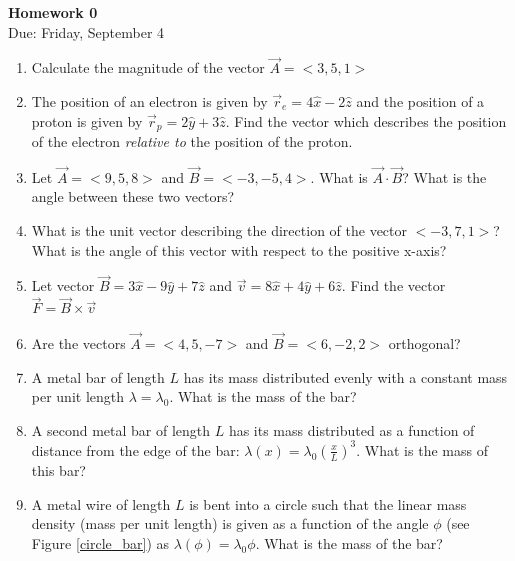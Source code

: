 \documentclass{article}
\begin{document}
\fancyfoot[C]{\thepage}
\vspace*{0cm}
\begin{center}
	{\LARGE \textbf{Homework 0}}\\
	\vspace{0.25cm}
	{\Large Due: Friday, September 4}
\end{center}

\begin{enumerate}
	\item Calculate the magnitude of the vector $\vec{A}=<3,5,1>$
	\item The position of an electron is given by $\vec{r}_e=4\hat{x} - 2\hat{z}$ and the position of a proton is given by $\vec{r}_p=2\hat{y} + 3\hat{z}$. Find the vector which describes the position of the electron \textit{relative to} the position of the proton.
	\item Let $\vec{A}=<9,5,8>$ and $\vec{B}=<-3,-5,4>$. What is $\vec{A}\cdot\vec{B}$? What is the angle between these two vectors?
	\item What is the unit vector describing the direction of the vector $<-3,7,1>$? What is the angle of this vector with respect to the positive x-axis?
	\item Let vector $\vec{B}=3\hat{x}-9\hat{y}+7\hat{z}$ and $\vec{v}=8\hat{x}+4\hat{y}+6\hat{z}$. Find the vector $\vec{F}=\vec{B}\times\vec{v}$
	\item Are the vectors $\vec{A}=<4,5,-7>$ and $\vec{B}=<6,-2,2>$ orthogonal?
	\item A metal bar of length $L$ has its mass distributed evenly with a constant mass per unit length $\lambda=\lambda_0$. What is the mass of the bar?
	\item A second metal bar of length $L$ has its mass distributed as a function of distance from the edge of the bar: $\lambda(x)=\lambda_0 \left(\frac{x}{L}\right)^3$. What is the mass of this bar?
	\item\label{problem_circle} A metal wire of length $L$ is bent into a circle such that the linear mass density (mass per unit length) is given as a function of the angle $\phi$ (see Figure \ref{circle_bar}) as $\lambda(\phi)=\lambda_0\phi$. What is the mass of the bar?
	

\end{enumerate}
\end{document}
